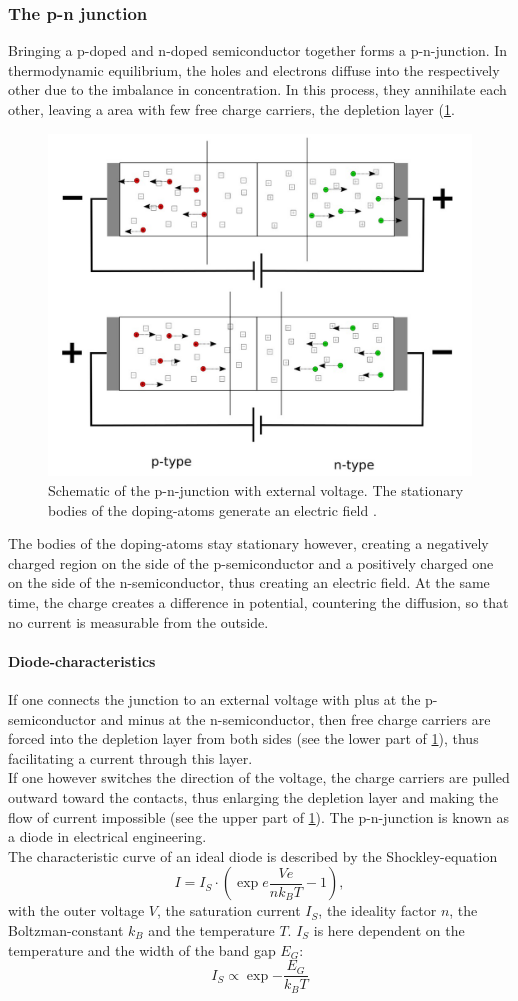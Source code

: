 \documentclass[english,  %
parskip=full,  %
headsepline]{scrartcl}
\begin{document}
\subsubsection{The p-n junction}\label{pnjunc}
Bringing a p-doped and n-doped semiconductor together forms a p-n-junction. In thermodynamic equilibrium, the holes and electrons diffuse into the respectively other due to the imbalance in concentration. In this process, they annihilate each other, leaving a area with few free charge carriers, the depletion layer (\cref{fig:depletion}.
\begin{figure}[H]
    \centering
    \includegraphics[width=0.7\linewidth]{depletion.jpg}
    \caption{Schematic of the p-n-junction with external voltage. The stationary bodies of the doping-atoms generate an electric field \cite{instructions}.}
    \label{fig:depletion}
\end{figure}
The bodies of the doping-atoms stay stationary however, creating a negatively charged region on the side of the p-semiconductor and a positively charged one on the side of the n-semiconductor, thus creating an electric field. At the same time, the charge creates a difference in potential, countering the diffusion, so that no current is measurable from the outside.
\paragraph{Diode-characteristics}
If one connects the junction to an external voltage with plus at the p-semiconductor and minus at the n-semiconductor, then free charge carriers are forced into the depletion layer from both sides (see the lower part of \cref{fig:depletion}), thus facilitating a current through this layer. \\
If one however switches the direction of the voltage, the charge carriers are pulled outward toward the contacts, thus enlarging the depletion layer and making the flow of current impossible (see the upper part of \cref{fig:depletion}). The p-n-junction is known as a diode in electrical engineering.\\ 
The characteristic curve of an ideal diode is described by the Shockley-equation
\begin{equation}
    I=I_S\cdot\left(\exp{e\frac{Ve}{nk_BT}}-1\right),\label{eq:shockley}
\end{equation}
with the outer voltage $V$, the saturation current $I_S$, the ideality factor $n$, the Boltzman-constant $k_B$ and the temperature $T$. $I_S$ is here dependent on the temperature and the width of the band gap $E_G$:
\[I_S\propto\exp{-\frac{E_G}{k_BT}}\]
\end{document}

